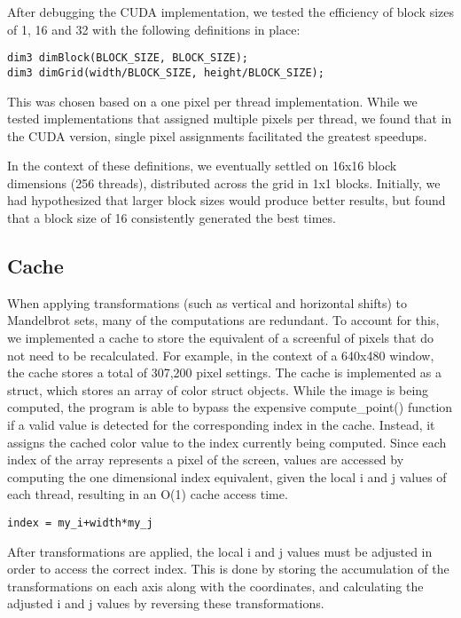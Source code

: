 \documentclass{article}
\begin{document}
After debugging the CUDA implementation, we tested the efficiency of block sizes of 1, 16 and 32 with the following definitions in place: 

\begin{verbatim}
dim3 dimBlock(BLOCK_SIZE, BLOCK_SIZE); 
dim3 dimGrid(width/BLOCK_SIZE, height/BLOCK_SIZE);
\end{verbatim}

This was chosen based on a one pixel per thread implementation.
While we tested implementations that assigned multiple pixels per thread, we found that in the CUDA version, single pixel assignments facilitated the greatest speedups.

In the context of these definitions, we eventually settled on 16x16 block dimensions (256 threads), distributed across the grid in 1x1 blocks.
Initially, we had hypothesized that larger block sizes would produce better results, but found that a block size of 16 consistently generated the best times.

\subsection{Cache}

When applying transformations (such as vertical and horizontal shifts) to Mandelbrot sets, many of the computations are redundant.
To account for this, we implemented a cache to store the equivalent of a screenful of pixels that do not need to be recalculated.
For example, in the context of a 640x480 window, the cache stores a total of 307,200 pixel settings.
The cache is implemented as a struct, which stores an array of color struct objects.
While the image is being computed, the program is able to bypass the expensive compute\_point() function if a valid value is detected for the corresponding index in the cache.
Instead, it assigns the cached color value to the index currently being computed.
Since each index of the array represents a pixel of the screen, values are accessed by computing the one dimensional index equivalent, given the local i and j values of each thread, resulting in an O(1) cache access time.

\begin{verbatim}
index = my_i+width*my_j
\end{verbatim}

After transformations are applied, the local i and j values must be adjusted in order to access the correct index.
This is done by storing the accumulation of the transformations on each axis along with the coordinates, and calculating the adjusted i and j values by reversing these transformations.\\
\end{document}
